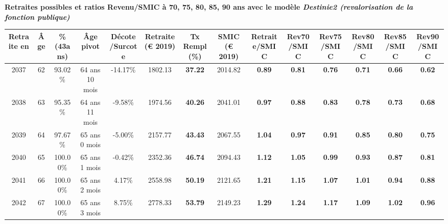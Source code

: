  \vspace{0.1cm} 
{\bf \noindent Retraites possibles et ratios Revenu/SMIC à 70, 75, 80, 85, 90 ans avec le modèle \emph{Destinie2 (revalorisation de la fonction publique)}}  
 
\begin{adjustbox}{max width=\textwidth} 
\begin{tabular}[htb]{|c|c||c|c|c||c|c||c||c|c|c|c|c|c|} 
\hline 
 Retraite en &  Âge &  \%(43ans) &  Âge pivot &  Décote/Surcote &  Retraite (\euro{} 2019) &  Tx Rempl(\%) &  SMIC (\euro{} 2019) &  Retraite/SMIC &  Rev70/SMIC &  Rev75/SMIC &  Rev80/SMIC &  Rev85/SMIC &  Rev90/SMIC \\ 
\hline \hline 
 2037 &  62 &  93.02\% &  64 ans 10 mois &  -14.17\% &  1802.13 &  {\bf 37.22} &  2014.82 &  {\bf {\color{red} 0.89}} &  {\bf {\color{red} 0.81}} &  {\bf {\color{red} 0.76}} &  {\bf {\color{red} 0.71}} &  {\bf {\color{red} 0.66}} &  {\bf {\color{red} 0.62}} \\ 
\hline 
 2038 &  63 &  95.35\% &  64 ans 11 mois &  -9.58\% &  1974.56 &  {\bf 40.26} &  2041.01 &  {\bf {\color{red} 0.97}} &  {\bf {\color{red} 0.88}} &  {\bf {\color{red} 0.83}} &  {\bf {\color{red} 0.78}} &  {\bf {\color{red} 0.73}} &  {\bf {\color{red} 0.68}} \\ 
\hline 
 2039 &  64 &  97.67\% &  65 ans 0 mois &  -5.00\% &  2157.77 &  {\bf 43.43} &  2067.55 &  {\bf 1.04} &  {\bf {\color{red} 0.97}} &  {\bf {\color{red} 0.91}} &  {\bf {\color{red} 0.85}} &  {\bf {\color{red} 0.80}} &  {\bf {\color{red} 0.75}} \\ 
\hline 
 2040 &  65 &  100.00\% &  65 ans 1 mois &  -0.42\% &  2352.36 &  {\bf 46.74} &  2094.43 &  {\bf 1.12} &  {\bf 1.05} &  {\bf {\color{red} 0.99}} &  {\bf {\color{red} 0.93}} &  {\bf {\color{red} 0.87}} &  {\bf {\color{red} 0.81}} \\ 
\hline 
 2041 &  66 &  100.00\% &  65 ans 2 mois &  4.17\% &  2558.98 &  {\bf 50.19} &  2121.65 &  {\bf 1.21} &  {\bf 1.15} &  {\bf 1.07} &  {\bf 1.01} &  {\bf {\color{red} 0.94}} &  {\bf {\color{red} 0.88}} \\ 
\hline 
 2042 &  67 &  100.00\% &  65 ans 3 mois &  8.75\% &  2778.33 &  {\bf 53.79} &  2149.23 &  {\bf 1.29} &  {\bf 1.24} &  {\bf 1.17} &  {\bf 1.09} &  {\bf 1.02} &  {\bf {\color{red} 0.96}} \\ 
\hline 
\hline 
\end{tabular} 
\end{adjustbox} 
 
 \vspace{0.1cm} 


